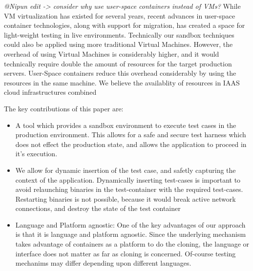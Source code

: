 \textit{@Nipun edit -> consider why use user-space containers instead of VMs?}
While VM virtualization has existed for several years, recent advances in user-space container technologies, along with support for migration, has created a space for light-weight testing in live environments.
Technically our sandbox techniques could also be applied using more traditional Virtual Machines. 
However, the overhead of using Virtual Machines is considerably higher, and it would technically require double the amount of resources for the target production servers.
User-Space containers reduce this overhead considerably by using the resources in the same machine.
We believe the availablity of resources in IAAS cloud infrastructures combined 


The key contributions of this paper are:

\begin{itemize}
\item A tool which provides a sandbox environment to execute test cases in the production environment. 
This allows for a safe and secure test harness which does not effect the production state, and allows the application to proceed in it's execution.
\item We allow for dynamic insertion of the test case, and safetly capturing the context of the application. Dynamically inserting test-cases is important to avoid relaunching binaries in the test-container with the required test-cases. 
Restarting binaries is not possible, because it would break active network connections, and destroy the state of the test container
\item Language and Platform agnostic: One of the key advantages of our approach is that it is language and platform agnostic. Since the underlying mechanism takes advantage of containers as a platform to do the cloning, the language or interface does not matter as far as cloning is concerned. 
Of-course testing mechanims may differ depending upon different languages.
\end{itemize}




